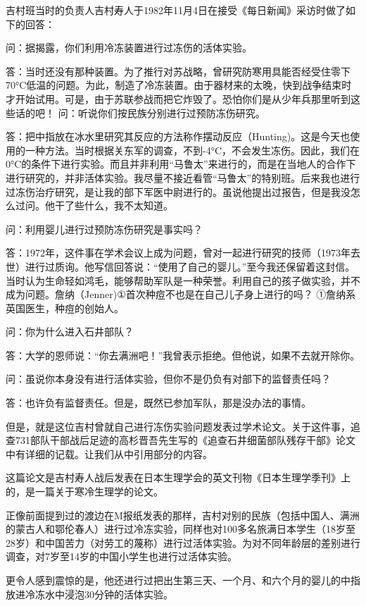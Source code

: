 \documentclass[a4paper,12pt,UTF8,twoside]{ctexbook}
\begin{document}
吉村班当时的负责人吉村寿人于1982年11月4日在接受《每日新闻》采访时做了如下的回答：

问：据揭露，你们利用冷冻装置进行过冻伤的活体实验。

答：当时还没有那种装置。为了推行对苏战略，曾研究防寒用具能否经受住零下70°C低温的问题。为此，制造了冷冻装置。由于器材来的太晚，快到战争结束时才开始试用。可是，由于苏联参战而把它炸毁了。恐怕你们是从少年兵那里听到这些话的吧！
问：听说你们按民族分别进行过预防冻伤研究。

答：把中指放在冰水里研究其反应的方法称作摆动反应（Hunting)。这是今天也使用的一种方法。当时根据关东军的调查，不到-4°C，不会发生冻伤。因此，我们在0°C的条件下进行实验。而且并非利用“马鲁太”来进行的，而是在当地人的合作下进行研究的，并非活体实验。我尽量不接近看管“马鲁太”的特别班。后来我也进行过冻伤治疗研究，是让我的部下军医中尉进行的。虽说他提出过报告，但是我没怎么过问。他干了些什么，我不太知道。

问：利用婴儿进行过预防冻伤研究是事实吗？

答：1972年，这件事在学术会议上成为问题，曾对一起进行研究的技师（1973年去世）进行过质询。他写信回答说：“使用了自己的婴儿。”至今我还保留着这封信。当时认为生命轻如鸿毛，能够帮助军队是一种荣誉。利用自己的孩子做实验，并不成为问题。詹纳（Jenner)①首次种痘不也是在自己儿子身上进行的吗？
①詹纳系英国医生，种痘的创始人。

问：你为什么进入石井部队？

答：大学的恩师说：“你去满洲吧！”我曾表示拒绝。但他说，如果不去就开除你。

问：虽说你本身没有进行活体实验，但你不是仍负有对部下的监督责任吗？

答：也许负有监督责任。但是，既然已参加军队，那是没办法的事情。

但是，就是这位吉村曾就自己进行冻伤实验问题发表过学术论文。关于这件事，追查731部队干部战后足迹的高杉晋吾先生写的《追查石井细菌部队残存干部》论文中有详细的记载。让我们从中引用部分的内容。

这篇论文是吉村寿人战后发表在日本生理学会的英文刊物《日本生理学季刊》上的，是一篇关于寒冷生理学的论文。

正像前面提到过的渡边在M报纸发表的那样，吉村对别的民族（包括中国人、满洲的蒙古人和鄂伦春人）进行过冷冻实验，同样也对100多名旅满日本学生（18岁至28岁）和中国苦力（对劳工的蔑称）进行过活体实验。为对不同年龄层的差别进行调查，对7岁至14岁的中国小学生也进行过活体实验。

更令人感到震惊的是，他还进行过把出生第三天、一个月、和六个月的婴儿的中指放进冷冻水中浸泡30分钟的活体实验。
\end{document}
